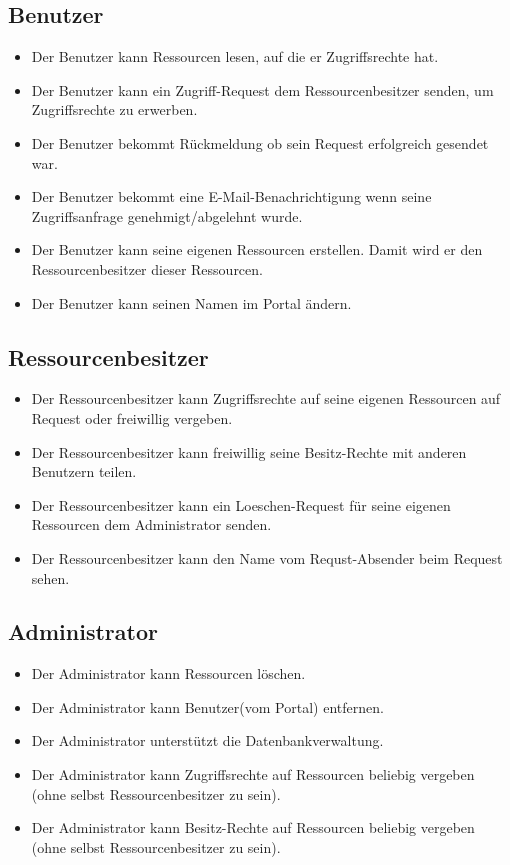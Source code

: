 \documentclass[parskip=full,11pt]{scrartcl}
\begin{document}
\subsection*{Benutzer}
\begin{itemize}[itemsep=0pt]
\item Der Benutzer kann Ressourcen lesen, auf die er \gls{Zugriffsrechte} hat.
\item Der Benutzer kann ein \gls{Zugriff-Request} dem Ressourcenbesitzer senden, um Zugriffsrechte zu erwerben.
\item Der Benutzer bekommt Rückmeldung ob sein Request erfolgreich gesendet war.
\item Der Benutzer bekommt eine E-Mail-Benachrichtigung wenn seine Zugriffsanfrage genehmigt/abgelehnt wurde.
\item Der Benutzer kann seine eigenen Ressourcen erstellen. Damit wird er den Ressourcenbesitzer dieser Ressourcen.
\item Der Benutzer kann seinen Namen im Portal ändern.
\end{itemize}
 
\subsection*{Ressourcenbesitzer}
\begin{itemize}[itemsep=0pt]

\item Der Ressourcenbesitzer kann Zugriffsrechte auf seine eigenen Ressourcen auf Request oder freiwillig vergeben.
\item Der Ressourcenbesitzer kann freiwillig seine \gls{Besitz-Rechte} mit anderen Benutzern teilen.
\item Der Ressourcenbesitzer kann ein \gls{Loeschen-Request} für seine eigenen Ressourcen dem Administrator senden.
\item Der Ressourcenbesitzer kann den Name vom Requst-Absender beim Request sehen.

\end{itemize}

\subsection*{Administrator}
\begin{itemize}[itemsep=0pt]
\item Der Administrator kann Ressourcen löschen.
\item Der Administrator kann Benutzer(vom Portal) entfernen.
\item Der Administrator unterstützt die Datenbankverwaltung.
\item Der Administrator kann Zugriffsrechte auf Ressourcen beliebig vergeben (ohne selbst Ressourcenbesitzer zu sein).
\item Der Administrator kann Besitz-Rechte auf Ressourcen beliebig vergeben (ohne selbst Ressourcenbesitzer zu sein). 

\end{itemize}
\end{document}
